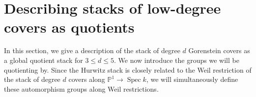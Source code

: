 \documentclass[12 pt]{amsart}
\theoremstyle{plain}
\theoremstyle{definition}
\theoremstyle{remark}
\numberwithin{equation}{section}
\newcommand\bp{\mathbb P}
\DeclareMathOperator\spec{\operatorname{Spec}}
\begin{document}

\section{Describing  stacks of low-degree covers as quotients}
\label{section:presentation-finite-covers}

In this section, we give a description of the stack of degree $d$ Gorenstein
covers as a global quotient stack for
$3 \leq d \leq 5$. We now introduce the groups we will be quotienting by.  
Since the Hurwitz stack is closely related to the Weil restriction of
the stack of degree $d$ covers along $\bp^1 \to \spec k$, we will simultaneously
define these automorphism groups along Weil restrictions.
\end{document}
